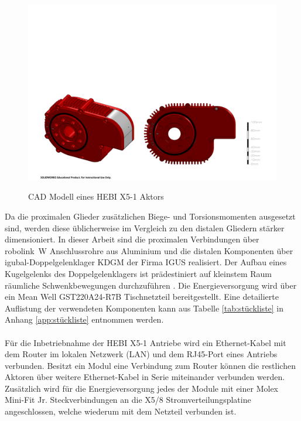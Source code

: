 \documentclass[Bachelor, BMR, ngerman]{twbook}
\begin{document}
    \begin{figure}[H]
      \centering
      {
        \includegraphics[width=\linewidth]{hebi-x5-1.PDF}
      }
      \caption[CAD Modell eines HEBI X5-1 Aktors]{CAD Modell eines HEBI X5-1 Aktors}
      \label{fig:hebi-x5-1}
    \end{figure}
    \noindent
    Da die proximalen Glieder zusätzlichen Biege- und Torsionsmomenten ausgesetzt sind, werden diese üblicherweise im Vergleich zu den distalen Gliedern stärker dimensioniert. In dieser Arbeit sind die proximalen Verbindungen über robolink\textregistered\ W Anschlussrohre aus Aluminium und die distalen Komponenten über igubal\textregistered-Doppelgelenklager KDGM der Firma IGUS realisiert. Der Aufbau eines Kugelgelenks des Doppelgelenklagers ist prädestiniert auf kleinstem Raum räumliche Schwenkbewegungen durchzuführen \cite{Ne06}. Die Energieversorgung wird über ein Mean Well GST220A24-R7B Tischnetzteil bereitgestellt. Eine detailierte Auflistung der verwendeten Komponenten kann aus Tabelle \ref{tab:stückliste} in Anhang \ref{app:stückliste} entnommen werden.\\
    \\
    Für die Inbetriebnahme der HEBI X5-1 Antriebe wird ein Ethernet-Kabel mit dem Router im lokalen Netzwerk (LAN) und dem RJ45-Port eines Antriebs verbunden. Besitzt ein Modul eine Verbindung zum Router können die restlichen Aktoren über weitere Ethernet-Kabel in Serie miteinander verbunden werden. Zusätzlich wird für die Energieversorgung jedes der Module mit einer Molex Mini-Fit Jr. Steckverbindungen an die X5/8 Stromverteilungsplatine angeschlossen, welche wiederum mit dem Netzteil verbunden ist.
    
\end{document}
